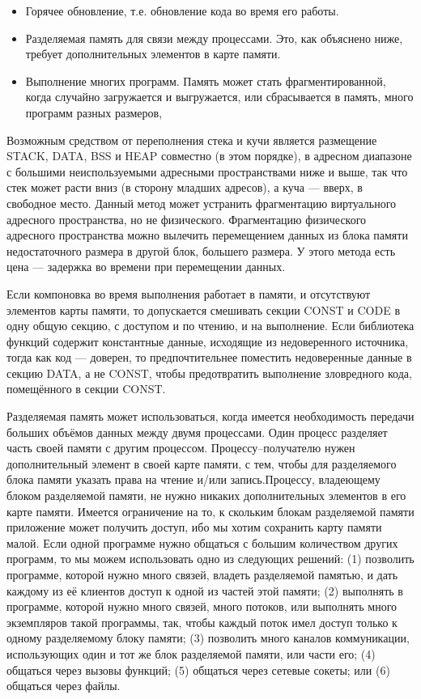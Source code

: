 \documentclass[forwardcom.tex]{subfiles}
\begin{document}
\begin{itemize}
\item Горячее обновление, т.е. обновление кода во время его работы. 

\item Разделяемая память для связи между процессами. Это, как объяснено ниже, требует дополнительных элементов в карте памяти.

\item Выполнение многих программ. Память может стать фрагментированной, когда случайно загружается и выгружается, или сбрасывается в память, много программ разных размеров,
\end{itemize}

Возможным средством от переполнения стека и кучи является размещение STACK, DATA, BSS и HEAP совместно (в этом порядке), в адресном диапазоне с большими неиспользуемыми адресными пространствами ниже и выше, так что стек может расти вниз (в сторону младших адресов), а куча --- вверх, в свободное место. Данный метод может устранить фрагментацию виртуального адресного пространства, но не физического. Фрагментацию физического адресного пространства можно вылечить перемещением данных из блока памяти недостаточного размера в другой блок, большего размера. У этого метода есть цена --- задержка во времени при перемещении данных. 

Если компоновка во время выполнения работает в памяти, и отсутствуют элементов карты памяти, то допускается смешивать секции CONST и CODE в одну общую секцию, с доступом и по чтению, и на выполнение. Если библиотека функций содержит константные данные, исходящие из недоверенного источника, тогда как код --- доверен, то предпочтительнее поместить недоверенные данные в секцию DATA, а не CONST, чтобы предотвратить выполнение зловредного кода, помещённого в секции CONST.

\label{sharedMemory}
Разделяемая память может использоваться, когда имеется необходимость передачи больших объёмов данных между двумя процессами. Один процесс разделяет часть своей памяти с другим процессом. Процессу--получателю нужен дополнительный элемент в своей карте памяти, с тем, чтобы для разделяемого блока памяти указать права на чтение и/или запись.Процессу, владеющему блоком разделяемой памяти, не нужно никаких дополнительных элементов в его карте памяти. Имеется ограничение на то, к скольким блокам разделяемой памяти приложение может получить доступ, ибо мы хотим сохранить карту памяти малой. Если одной программе нужно общаться с большим количеством других программ, то мы можем использовать одно из следующих решений: (1) позволить программе, которой нужно много связей, владеть разделяемой памятью, и дать каждому из её клиентов доступ к одной из частей этой памяти; (2) выполнять в программе, которой нужно много связей, много потоков, или выполнять много экземпляров такой программы, так, чтобы каждый поток имел доступ только к одному разделяемому блоку памяти; (3) позволить много каналов коммуникации, использующих один и тот же блок разделяемой памяти, или части его;  (4) общаться через вызовы функций; (5) общаться через сетевые сокеты; или (6) общаться через файлы. 
\end{document}

